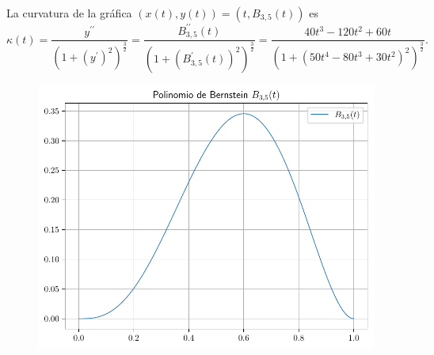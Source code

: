 \begin{frame}
\begin{solution}
        La curvatura de la gráfica
        \begin{math}
            \left(
            x\left(t\right),
            y\left(t\right)
            \right)=
            \left(
            t,
            B_{3,5}\left(t\right)
            \right)
        \end{math}
        es
        \begin{equation*}
            \kappa\left(t\right)=
            \dfrac{
                y^{\prime\prime}
            }{
                {\left(1+{\left(y^{\prime}\right)}^{2}\right)}^{\frac{3}{2}}
            }=
            \dfrac{
                B^{\prime\prime}_{3,5}\left(t\right)
            }{
                {\left(1+{\left(B^{\prime}_{3,5}\left(t\right)\right)}^{2}\right)}^{\frac{3}{2}}
            }=
            \dfrac{
            40t^{3}-120t^{2}+60t
            }{
            {\left(1+{\left(50t^{4}-80t^{3}+30t^{2}\right)}^{2}\right)}^{\frac{3}{2}}
            }.
        \end{equation*}
    \end{solution}
\end{frame}

\begin{frame}
    \begin{solution}
        \begin{figure}[ht!]
            \centering
            \includegraphics[width=.72\paperwidth]{p1}
        \end{figure}
    \end{solution}
\end{frame}

